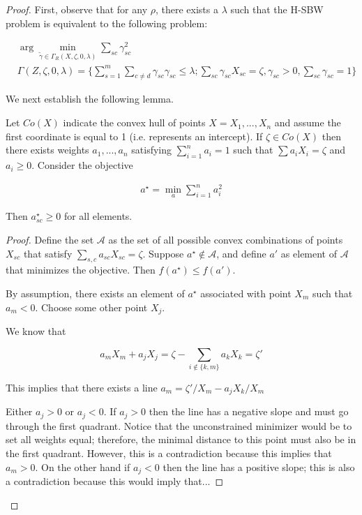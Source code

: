 \begin{proof}
First, observe that for any $\rho$, there exists a $\lambda$ such that the H-SBW problem is equivalent to the following problem:

\begin{align*}
    &\arg\min_{\tilde{\gamma} \in \Gamma_R(X, \zeta, 0, \lambda)}\sum_{sc}\gamma_{sc}^2  \\ 
    &\Gamma(Z, \zeta, 0, \lambda) = \{\sum_{s=1}^m\sum_{c\ne d}\gamma_{sc}\gamma_{sc} \le \lambda; \sum_{sc}\gamma_{sc}X_{sc} = \zeta, \gamma_{sc} > 0, \sum_{sc}\gamma_{sc} = 1\}
\end{align*}

We next establish the following lemma.

\begin{lemma}
Let $Co(X)$ indicate the convex hull of points $X = X_1, ..., X_n$ and assume the first coordinate is equal to 1 (i.e. represents an intercept). If $\zeta \in Co(X)$ then there exists weights $a_1, ..., a_n$ satisfying $\sum_{i=1}^n a_i = 1$ such that $\sum a_i X_i = \zeta$ and $a_i \ge 0$. Consider the objective

\begin{align*}
a^\star = \min_a \sum_{i=1}^n a_i^2 
\end{align*}

Then $a_{sc}^\star \ge 0$ for all elements.
\end{lemma}

\begin{proof}
Define the set $\mathcal{A}$ as the set of all possible convex combinations of points $X_{sc}$ that satisfy $\sum_{s,c} a_{sc}X_{sc} = \zeta$. Suppose $a^\star \not\in \mathcal{A}$, and define $a'$ as element of $\mathcal{A}$ that minimizes the objective. Then $f(a^\star) \le f(a')$. 

By assumption, there exists an element of $a^\star$ associated with point $X_m$ such that $a_m < 0$. Choose some other point $X_j$. 

We know that 

$$
a_mX_m + a_jX_j = \zeta - \sum_{i \not\in \{k,m\}}a_kX_k = \zeta'
$$

This implies that there exists a line $a_m = \zeta'/X_m - a_jX_k/X_m$

Either $a_j > 0$ or $a_j < 0$. If $a_j > 0$ then the line has a negative slope and must go through the first quadrant. Notice that the unconstrained minimizer would be to set all weights equal; therefore, the minimal distance to this point must also be in the first quadrant. However, this is a contradiction because this implies that $a_m > 0$. On the other hand if $a_j < 0$ then the line has a positive slope; this is also a contradiction because this would imply that... 
\end{proof}


\end{proof}
